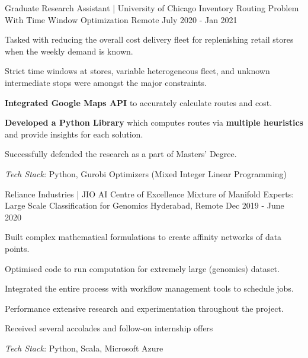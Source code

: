 \documentclass[11pt, a4paper]{awesome-cv} %
\begin{document}
\begin{cventries}

  \cventry
    {Graduate Research Assistant | University of Chicago} %
    {Inventory Routing Problem With Time Window Optimization} %
    {Remote} %
    {July 2020 - Jan 2021} %
    {
      \begin{cvitems} %
        \item {Tasked with reducing the overall cost delivery fleet for replenishing retail stores when the weekly demand is known.}
        \item {Strict time windows at stores, variable heterogeneous fleet, and unknown intermediate stops were amongst the major constraints.}
        \item {\textbf{ Integrated Google Maps API}} to accurately calculate routes and cost.
        \item {\textbf{Developed a Python Library} which computes routes via \textbf{multiple heuristics} and provide insights for each solution.}
        \item Successfully defended the research as a part of Masters' Degree.
        \item {\textit{{\color{awesome-red} Tech Stack:}} Python, Gurobi Optimizers (Mixed Integer Linear Programming)}
        \end{cvitems}
    }

  \cventry
    {Reliance Industries | JIO AI Centre of Excellence} %
    {Mixture of Manifold Experts: Large Scale Classification for Genomics} %
    {Hyderabad, Remote} %
    {Dec 2019 - June 2020} %
    {
      \begin{cvitems} %
        \item {Built complex mathematical formulations to create affinity networks of data points.}
        \item {Optimised code to run computation for extremely large (genomics) dataset.}
        \item {Integrated the entire process with workflow management tools to schedule jobs.}
        \item {Performance extensive research and experimentation throughout the project.}
        \item {Received several accolades and follow-on internship offers}
        \item {\textit{{\color{awesome-red} Tech Stack:}} Python, Scala, Microsoft Azure}
      \end{cvitems}
    }
\end{cventries}
\end{document}
